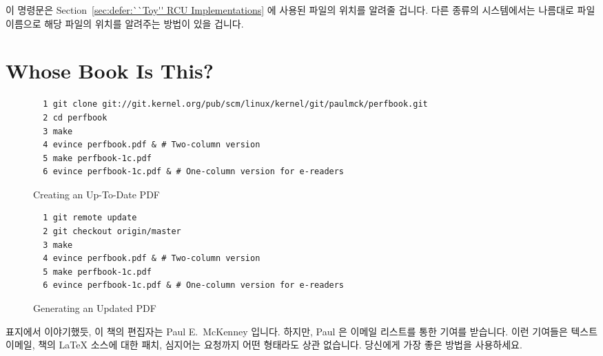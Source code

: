 이 명령문은 Section~\ref{sec:defer:``Toy'' RCU Implementations} 에 사용된
 파일의 위치를 알려줄 겁니다.
다른 종류의 시스템에서는 나름대로 파일 이름으로 해당 파일의 위치를 알려주는
방법이 있을 겁니다.

\iffalse
This command will locate the file \co{rcu_rcpls.c}, which is called out in
Section~\ref{sec:defer:``Toy'' RCU Implementations}.
Other types of systems have well-known ways of locating files by filename.
\fi

\section{Whose Book Is This?}
\label{sec:howto:Whose Book Is This?}

\begin{figure*}[tbp]
{
\scriptsize
\begin{verbatim}
  1 git clone git://git.kernel.org/pub/scm/linux/kernel/git/paulmck/perfbook.git
  2 cd perfbook
  3 make
  4 evince perfbook.pdf & # Two-column version
  5 make perfbook-1c.pdf
  6 evince perfbook-1c.pdf & # One-column version for e-readers
\end{verbatim}
}
\caption{Creating an Up-To-Date PDF}
\label{fig:howto:Creating a Up-To-Date PDF}
\end{figure*}

\begin{figure*}[tbp]
{
\scriptsize
\begin{verbatim}
  1 git remote update
  2 git checkout origin/master
  3 make
  4 evince perfbook.pdf & # Two-column version
  5 make perfbook-1c.pdf
  6 evince perfbook-1c.pdf & # One-column version for e-readers
\end{verbatim}
}
\caption{Generating an Updated PDF}
\label{fig:howto:Generating an Updated PDF}
\end{figure*}

표지에서 이야기했듯, 이 책의 편집자는 Paul E.~McKenney 입니다.
하지만, Paul 은  이메일 리스트를 통한 기여를
받습니다.  이런 기여들은 텍스트 이메일, 책의 \LaTeX{} 소스에 대한 패치,
심지어는  요청까지 어떤 형태라도 상관 없습니다.  당신에게
가장 좋은 방법을 사용하세요.

\iffalse
As the cover says, the editor is one Paul E.~McKenney.
However, the editor does accept contributions via the
\co{perfbook@vger.kernel.org} email list.
These contributions can be in pretty much any form, with popular
approaches including text emails,
patches against the book's \LaTeX{} source, and even \co{git pull} requests.
Use whatever form works best for you.
\fi

